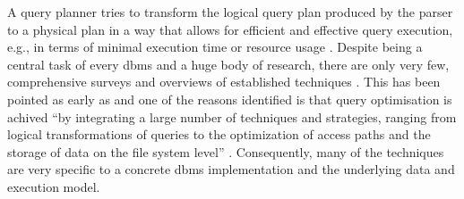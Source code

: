 A query planner tries to transform the logical query plan produced by the parser to a physical plan in a way that allows for efficient and effective query execution, e.g., in terms of minimal execution time or resource usage \cite{Jarke:1984Query,Garcia:2009Database}. Despite being a central task of every \acrshort{dbms} and a huge body of research, there are only very few, comprehensive surveys and overviews of established techniques \cite{Jarke:1984Query,Graefe:1993Query,Chaudhuri:1998An}. This has been pointed as early as \citeyear{Jarke:1984Query} and one of the reasons identified is that query optimisation is achived ``by integrating a large number of techniques and strategies, ranging from logical transformations of queries to the optimization of access paths and the storage of data on the file system level'' \cite{Jarke:1984Query}. Consequently, many of the techniques are very specific to a concrete \acrshort{dbms} implementation and the underlying data and execution model.


